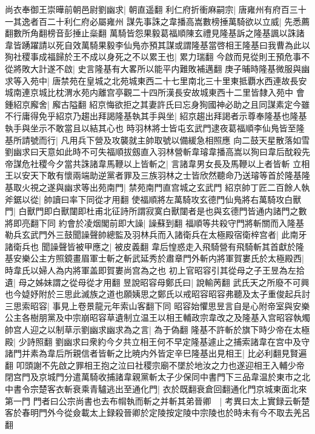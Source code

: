 尚衣奉御王崇曄前朝邑尉劉幽求|{
	朝直遥翻}
利仁府折衝麻嗣宗|{
	唐雍州有府百三十一其逸者百二十利仁府必屬雍州}
謀先事誅之韋播高嵩數榜捶萬騎欲以立威|{
	先悉薦翻數所角翻榜音彭捶止橤翻}
萬騎皆怨果毅葛福順陳玄禮見隆基訴之隆基諷以誅諸韋皆踴躍請以死自效萬騎果毅李仙鳬亦預其謀或謂隆基當啓相王隆基曰我曹為此以狥社稷事成福歸於王不成以身死之不以累王也|{
	累力瑞翻}
今啟而見從則王預危事不從將敗大計遂不啟|{
	史言隆基有大畧所以能平内難敗補邁翻}
庚子晡時隆基微服與幽求等入苑中|{
	唐禁苑在皇城之北苑城東西二十七里南北三十里東抵覇水西連故長安城南連京城比枕渭水苑内離宫亭觀二十四所漢長安故城東西十二里皆隸入苑中}
會鍾紹京廨舍|{
	廨古隘翻}
紹京悔欲拒之其妻許氏曰忘身狥國神必助之且同謀素定今雖不行庸得免乎紹京乃趨出拜謁隆基執其手與坐|{
	紹京趨出拜謁者示尊奉隆基也隆基執手與坐示不敢當且以結其心也}
時羽林將士皆屯玄武門逮夜葛福順李仙鳬皆至隆基所請號而行|{
	凡用兵下營及攻襲就主帥取號以備緩急相照應}
向二鼓天星散落如雪劉幽求曰天意如此時不可失福順拔劔直入羽林營斬韋璿韋播高嵩以狥曰韋后酖殺先帝謀危社稷今夕當共誅諸韋馬鞭以上皆斬之|{
	言諸韋男女長及馬鞭以上者皆斬}
立相王以安天下敢有懷兩端助逆黨者罪及三族羽林之士皆欣然聽命乃送璿等首於隆基隆基取火視之遂與幽求等出苑南門|{
	禁苑南門直宫城之玄武門}
紹京帥丁匠二百餘人執斧鋸以從|{
	帥讀曰率下同從才用翻}
使福順將左萬騎攻玄德門仙鳬將右萬騎攻白獸門|{
	白獸門即白獸闥即杜甫北征詩所謂寂寞白獸闥者是也與玄德門皆通内諸門之數將即亮翻下同}
約會於凌烟閣前即大譟|{
	譟蘇到翻}
福順等共殺守門將斬關而入隆基勒兵玄武門外三鼓聞譟聲帥總監及羽林兵而入諸衛兵在太極殿宿衛梓宫者|{
	此南牙諸衛兵也}
聞譟聲皆被甲應之|{
	被皮義翻}
韋后惶惑走入飛騎營有飛騎斬其首獻於隆基安樂公主方照鏡畫眉軍士斬之斬武延秀於肅章門外斬内將軍賀婁氏於太極殿西|{
	時韋氏以婦人為内將軍盖即賀婁尚宫為之也}
初上官昭容引其從母之子王昱為左拾遺|{
	母之姊妹謂之從母從才用翻}
昱說昭容母鄭氏曰|{
	說輸苪翻}
武氏天之所廢不可興也今媫妤附於三思此滅族之道也願姨思之鄭氏以戒昭容昭容弗聽及太子重俊起兵討三思索昭容|{
	事見上卷景龍元年索山客翻下同}
昭容始懼思昱言自是心附帝室與安樂公主各樹朋黨及中宗崩昭容草遺制立温王以相王輔政宗韋改之及隆基入宫昭容執燭帥宫人迎之以制草示劉幽求幽求為之言|{
	為于偽翻}
隆基不許斬於旗下時少帝在太極殿|{
	少詩照翻}
劉幽求曰衆約今夕共立相王何不早定隆基遽止之捕索諸韋在宫中及守諸門并素為韋后所親信者皆斬之比暁内外皆定辛巳隆基出見相王|{
	比必利翻見賢遍翻}
叩頭謝不先啟之罪相王抱之泣曰社稷宗廟不墜於地汝之力也遂迎相王入輔少帝閉宫門及京城門分遣萬騎收捕諸韋親黨斬太子少保同中書門下三品韋温於東市之北中書令宗楚客衣斬衰乘青驢逃出至通化門|{
	衣於既翻衰倉回翻通化門京城東面北來第一門}
門者曰公宗尚書也去布㡌執而斬之并斬其弟晉卿　|{
	考異曰太上實録云斬楚客於春明門外今從僉載太上録殺晉卿於定陵按定陵中宗陵也於時未有今不取去羌呂翻}
